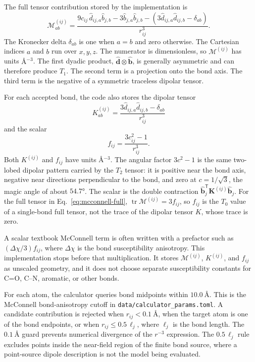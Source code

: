 \documentclass[11pt]{article}
\begin{document}
The full tensor contribution stored by the implementation is
\begin{equation}
  \mathcal M^{(ij)}_{ab} =
  \frac{
    9c_{ij}\,\hat d_{ij,a}\hat b_{j,b}
    -3\hat b_{j,a}\hat b_{j,b}
    -\left(3\hat d_{ij,a}\hat d_{ij,b}-\delta_{ab}\right)}
  {r_{ij}^{3}} .
  \label{eq:mcconnell-full}
\end{equation}
The Kronecker delta \(\delta_{ab}\) is one when \(a=b\) and zero otherwise.
The Cartesian indices \(a\) and \(b\) run over \(x,y,z\).
The numerator is dimensionless, so
\(\mathcal M^{(ij)}\) has units \(\si{\angstrom^{-3}}\). The first dyadic
product, \(\hat{\bm d}\otimes\hat{\bm b}\), is generally asymmetric and can
therefore produce \(T_1\). The second term is a projection onto the bond axis.
The third term is the negative of a symmetric traceless dipolar tensor.

For each accepted bond, the code also stores the dipolar tensor
\begin{equation}
  K^{(ij)}_{ab} =
  \frac{3\hat d_{ij,a}\hat d_{ij,b}-\delta_{ab}}{r_{ij}^{3}}
  \label{eq:dipolar}
\end{equation}
and the scalar
\begin{equation}
  f_{ij} =
  \frac{3c_{ij}^{2}-1}{r_{ij}^{3}} .
  \label{eq:scalar}
\end{equation}
Both \(K^{(ij)}\) and \(f_{ij}\) have units \(\si{\angstrom^{-3}}\).
The angular factor \(3c^2-1\) is the same two-lobed dipolar pattern carried by
the \(T_2\) tensor: it is positive near the bond axis, negative near directions
perpendicular to the bond, and zero at \(c=1/\sqrt{3}\), the magic angle of
about \(\ang{54.7}\). The scalar is the double contraction
\(\hat{\bm b}_j^{\mathsf T}\bm K^{(ij)}\hat{\bm b}_j\). For the full tensor in
Eq.~\eqref{eq:mcconnell-full}, \(\operatorname{tr}\mathcal M^{(ij)}=3f_{ij}\),
so \(f_{ij}\) is the \(T_0\) value of a single-bond full tensor, not the trace
of the dipolar tensor \(K\), whose trace is zero.

A scalar textbook McConnell term is often written with a prefactor such as
\((\Delta\chi/3)f_{ij}\), where \(\Delta\chi\) is the bond susceptibility
anisotropy. This implementation stops before that multiplication. It stores
\(\mathcal M^{(ij)}\), \(K^{(ij)}\), and \(f_{ij}\) as unscaled geometry, and it
does not choose separate susceptibility constants for C=O, C--N, aromatic, or
other bonds.

For each atom, the calculator queries bond midpoints within
\(\SI{10.0}{\angstrom}\). This is the McConnell bond-anisotropy cutoff in
\texttt{data/calculator\_params.toml}. A candidate contribution is rejected when
\(r_{ij}<\SI{0.1}{\angstrom}\), when the target atom is one of the bond
endpoints, or when \(r_{ij}\le 0.5\,\ell_j\), where \(\ell_j\) is the bond
length. The \(\SI{0.1}{\angstrom}\) guard prevents numerical divergence of the
\(r^{-3}\) expression. The \(0.5\,\ell_j\) rule excludes points inside the
near-field region of the finite bond source, where a point-source dipole
description is not the model being evaluated.
\end{document}
